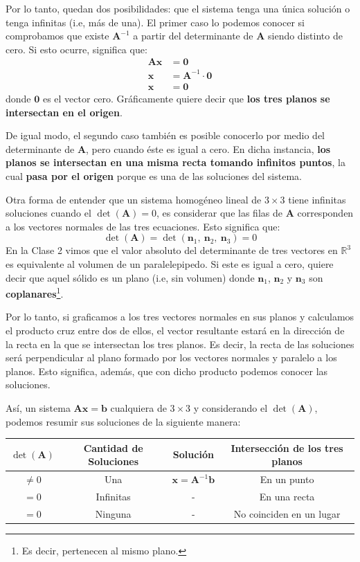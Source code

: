 \documentclass[12pt]{article}
\begin{document}
Por lo tanto, quedan dos posibilidades: que el sistema tenga una única solución o tenga infinitas (i.e, más de una). El primer caso lo podemos conocer si comprobamos que existe $\mathbf{A}^{-1}$ a partir del determinante de $\mathbf{A}$ siendo distinto de cero. Si esto ocurre, significa que:
\begin{align*}
  \mathbf{A} \mathbf{x} &= \mathbf{0} \\
             \mathbf{x} &= \mathbf{A}^{-1} \cdot \mathbf{0} \\
             \mathbf{x} &= \mathbf{0}
\end{align*}
donde $\mathbf{0}$ es el vector cero. Gráficamente quiere decir que \textbf{los tres planos se intersectan en el origen}.

De igual modo, el segundo caso también es posible conocerlo por medio del determinante de $\mathbf{A}$, pero cuando éste es igual a cero. En dicha instancia, \textbf{los planos se intersectan en una misma recta tomando infinitos puntos}, la cual \textbf{pasa por el origen} porque es una de las soluciones del sistema.

Otra forma de entender que un sistema homogéneo lineal de $3 \times 3$ tiene infinitas soluciones cuando el $\det(\mathbf{A}) = 0$, es considerar que las filas de $\mathbf{A}$ corresponden a los vectores normales de las tres ecuaciones. Esto significa que:
\[
  \det(\mathbf{A}) = \det(\mathbf{n}_{1}, \ \mathbf{n}_{2}, \ \mathbf{n}_{3}) = 0
\]
En la Clase 2 vimos que el valor absoluto del determinante de tres vectores en $\mathbb{R}^{3}$ es equivalente al volumen de un paralelepipedo. Si este es igual a cero, quiere decir que aquel sólido es un plano (i.e, sin volumen) donde $\mathbf{n}_{1}$, $\mathbf{n}_{2}$ y $\mathbf{n}_{3}$ son \textbf{coplanares}\footnote{Es decir, pertenecen al mismo plano.}.

Por lo tanto, si graficamos a los tres vectores normales en sus planos y calculamos el producto cruz entre dos de ellos, el vector resultante estará en la dirección de la recta en la que se intersectan los tres planos. Es decir, la recta de las soluciones será perpendicular al plano formado por los vectores normales y paralelo a los planos. Esto significa, además, que con dicho producto podemos conocer las soluciones.

Así, un sistema $\mathbf{A}\mathbf{x} = \mathbf{b}$ cualquiera de $3 \times 3$ y considerando el $\det(\mathbf{A})$, podemos resumir sus soluciones de la siguiente manera:

\begin{table}[hbt!]
\centering

\begin{tabular}{c c c c}
\hline
$\det(\mathbf{A})$ & Cantidad de Soluciones & Solución & Intersección de los tres planos \\
\hline
$\neq 0$ & Una & $\mathbf{x} = \mathbf{A}^{-1} \mathbf{b}$ & En un punto \\
$= 0$ & Infinitas & - & En una recta \\
$= 0$ & Ninguna & - & No coinciden en un lugar \\
\hline
\end{tabular}

\end{table}
\end{document}
